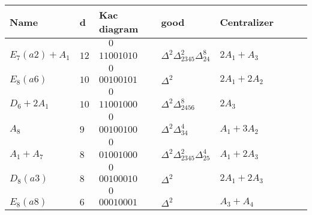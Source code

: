 \documentclass[10pt,leqno]{article}
\begin{document}
\pagestyle{headings}
\hskip0in
\begin{tabular}{|l|l|l|l|l|l|l|l|}
\hline
  Name&   d&  Kac diagram &good&Centralizer\\\hline
          &      &          $\phantom{11}0$&&\\
$E_7(a2)+A_1$ & $12$  &$11001010$ & $\Delta^2\Delta_{2345}^{2}\Delta_{24}^{8}$ & $2A_1+A_3$ \\\hline
          &      &          $\phantom{11}0$&&\\
$E_8(a6)$ & $10$  &$00100101$ & $\Delta^2$ & $2A_1+2A_2$ \\\hline
          &      &          $\phantom{11}0$&&\\
$D_6+2A_1$ & $10$  &$11001000$ & $\Delta^2\Delta_{2456}^{8}$ & $2A_3$ \\\hline
          &      &          $\phantom{11}0$&&\\
$A_8$ & $9$  &$00100100$ & $\Delta^2\Delta_{34}^{4}$ & $A_1+3A_2$ \\\hline
        &      &          $\phantom{11}0$&&\\
$A_1+A_7$ & $8$  &$01001000$ & $\Delta^2\Delta_{2345}^{2}\Delta_{25}^{4}$ & $A_1+2A_3$ \\\hline
        &      &          $\phantom{11}0$&&\\
$D_8(a3)$ & $8$  &$00100010$ & $\Delta^2$ & $2A_1+2A_3$ \\\hline
        &      &          $\phantom{11}0$&&\\
$E_8(a8)$ & $6$  &$00010001$ & $\Delta^2$ & $A_3+A_4$ \\\hline


\end{tabular}
\end{document}
